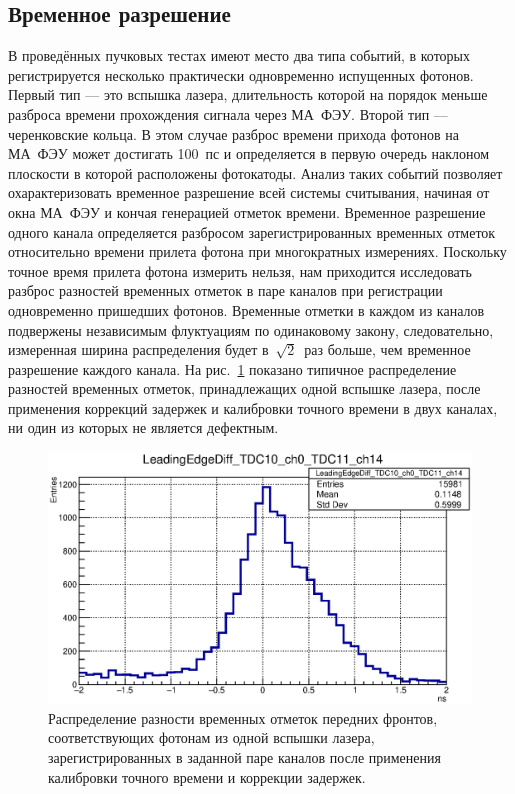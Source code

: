 \subsection{Временное разрешение}\label{section:TimeRes}

В проведённых пучковых тестах имеют место два типа событий, в которых регистрируется несколько практически одновременно испущенных фотонов. Первый тип --- это вспышка лазера, длительность которой на порядок меньше разброса времени прохождения сигнала через МА~ФЭУ. Второй тип --- черенковские кольца. В этом случае разброс времени прихода фотонов на МА~ФЭУ может достигать 100~пс и определяется в первую очередь наклоном плоскости в которой расположены фотокатоды.
Анализ таких событий позволяет охарактеризовать временное разрешение всей системы считывания, начиная от окна МА~ФЭУ и кончая генерацией отметок времени.
Временное разрешение одного канала определяется разбросом зарегистрированных временных отметок относительно времени прилета фотона при многократных измерениях. Поскольку точное время прилета фотона измерить нельзя, нам приходится исследовать разброс разностей временных отметок в паре каналов при регистрации одновременно пришедших фотонов. Временные отметки в каждом из каналов подвержены независимым флуктуациям по одинаковому закону, следовательно, измеренная ширина распределения будет в~$\sqrt 2$~раз больше, чем временное разрешение каждого канала. На рис.~\ref{fig:TimeRes} показано типичное распределение разностей временных отметок, принадлежащих одной вспышке лазера, после применения коррекций задержек и калибровки точного времени в двух каналах, ни один из которых не является дефектным.

\begin{figure}
\includegraphics[width=1.0\textwidth]{pictures/LeadingEdgeDiff_TDC10_ch0_TDC11_ch14_corr.eps}
\caption{Распределение разности временных отметок передних фронтов, соответствующих фотонам из одной вспышки лазера, зарегистрированных в заданной паре каналов после применения калибровки точного времени и коррекции задержек.}
\label{fig:TimeRes}
\end{figure}

